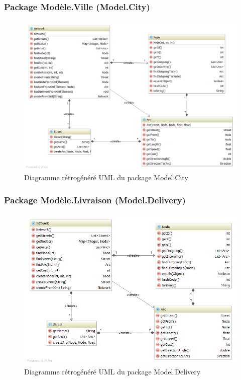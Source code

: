\subsubsection{Package Mod\`ele.Ville (Model.City)}

\begin{figure}[h]
    \centering
    \includegraphics[width=160mm]{../diagrams/classes_packages/final_classes_packages/model/city.png}
    \caption{Diagramme r\'etrog\'en\'er\'e UML du package Model.City}
    \label{diagram:gen_uml_model_city}
\end{figure}
\pagebreak

\subsubsection{Package Mod\`ele.Livraison (Model.Delivery)}

\begin{figure}[h]
    \centering
    \includegraphics[width=160mm]{../diagrams/classes_packages/final_classes_packages/model/delivery.png}
    \caption{Diagramme r\'etrog\'en\'er\'e UML du package Model.Delivery}
    \label{diagram:gen_uml_model_delivery}
\end{figure}
\pagebreak

